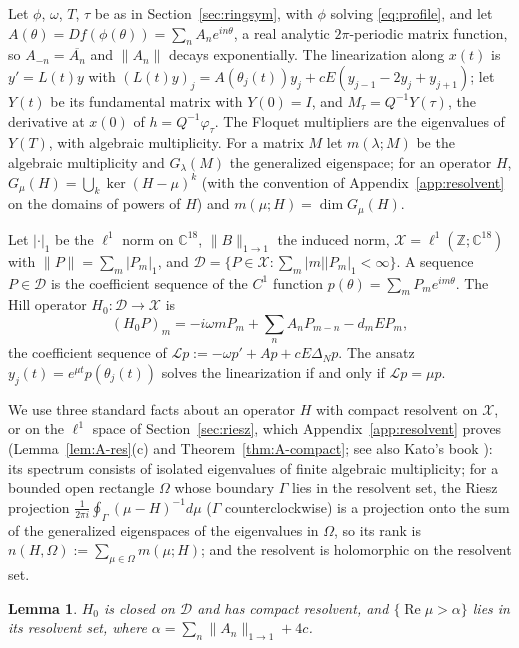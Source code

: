 \documentclass[11pt]{article}
\newtheorem{lemma}{Lemma}[section]
\theoremstyle{definition}
\newcommand{\C}{\mathbb{C}}
\newcommand{\Z}{\mathbb{Z}}
\newcommand{\re}{\operatorname{Re}}
\newcommand{\Dsp}{\mathcal{D}}
\newcommand{\Xsp}{\mathcal{X}}
\newcommand{\Lop}{\mathcal{L}}
\begin{document}
Let $\phi$, $\omega$, $T$, $\tau$ be as in Section~\ref{sec:ringsym}, with $\phi$ solving \eqref{eq:profile}, and let $A(\theta) = Df(\phi(\theta)) = \sum_n A_n e^{in\theta}$, a real analytic $2\pi$-periodic matrix function, so $A_{-n} = \overline{A_n}$ and $\|A_n\|$ decays exponentially. The linearization along $x(t)$ is $y' = L(t)y$ with $(L(t)y)_j = A(\theta_j(t))y_j + cE(y_{j-1} - 2y_j + y_{j+1})$; let $Y(t)$ be its fundamental matrix with $Y(0) = I$, and $M_\tau = Q^{-1}Y(\tau)$, the derivative at $x(0)$ of $h = Q^{-1}\varphi_\tau$. The Floquet multipliers are the eigenvalues of $Y(T)$, with algebraic multiplicity. For a matrix $M$ let $m(\lambda; M)$ be the algebraic multiplicity and $G_\lambda(M)$ the generalized eigenspace; for an operator $H$, $G_\mu(H) = \bigcup_k\ker(H - \mu)^k$ (with the convention of Appendix~\ref{app:resolvent} on the domains of powers of $H$) and $m(\mu; H) = \dim G_\mu(H)$.

Let $|\cdot|_1$ be the $\ell^1$ norm on $\C^{18}$, $\|B\|_{1\to1}$ the induced norm, $\Xsp = \ell^1(\Z; \C^{18})$ with $\|P\| = \sum_m|P_m|_1$, and $\Dsp = \{P \in \Xsp : \sum_m |m||P_m|_1 < \infty\}$. A sequence $P \in \Dsp$ is the coefficient sequence of the $C^1$ function $p(\theta) = \sum_m P_m e^{im\theta}$. The Hill operator $H_0: \Dsp \to \Xsp$ is
\begin{equation}\label{eq:H0}
  (H_0P)_m = -i\omega mP_m + \sum_n A_nP_{m-n} - d_mEP_m,
\end{equation}
the coefficient sequence of $\Lop p := -\omega p' + Ap + cE\Delta_Np$. The ansatz $y_j(t) = e^{\mu t}p(\theta_j(t))$ solves the linearization if and only if $\Lop p = \mu p$.

We use three standard facts about an operator $H$ with compact resolvent on $\Xsp$, or on the $\ell^1$ space of Section~\ref{sec:riesz}, which Appendix~\ref{app:resolvent} proves (Lemma~\ref{lem:A-res}(c) and Theorem~\ref{thm:A-compact}; see also Kato's book \cite[Ch.~III, Sect.~6]{kato1976}): its spectrum consists of isolated eigenvalues of finite algebraic multiplicity; for a bounded open rectangle $\Omega$ whose boundary $\Gamma$ lies in the resolvent set, the Riesz projection $\frac{1}{2\pi i}\oint_\Gamma(\mu - H)^{-1}d\mu$ ($\Gamma$ counterclockwise) is a projection onto the sum of the generalized eigenspaces of the eigenvalues in $\Omega$, so its rank is $n(H, \Omega) := \sum_{\mu\in\Omega}m(\mu; H)$; and the resolvent is holomorphic on the resolvent set.

\begin{lemma}\label{lem:H0}
$H_0$ is closed on $\Dsp$ and has compact resolvent, and $\{\re\mu > \alpha\}$ lies in its resolvent set, where $\alpha = \sum_n\|A_n\|_{1\to1} + 4c$.
\end{lemma}
\end{document}
